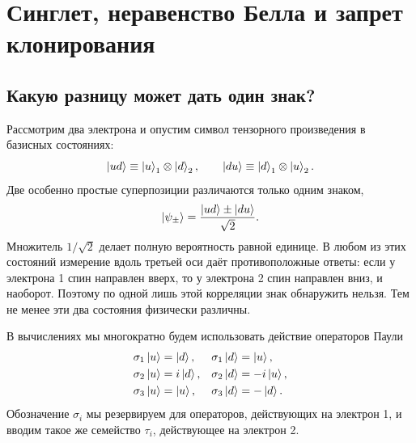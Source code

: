 \chapter{Синглет, неравенство Белла и запрет клонирования}


\section{Какую разницу может дать один знак?}

Рассмотрим два электрона и опустим символ тензорного произведения в базисных состояниях:
\begin{equation}
  \left\lvert ud\right\rangle\equiv\left\lvert u\right\rangle_1\otimes\left\lvert d\right\rangle_2,
  \qquad
  \left\lvert du\right\rangle\equiv\left\lvert d\right\rangle_1\otimes\left\lvert u\right\rangle_2.
\end{equation}
Две особенно простые суперпозиции различаются только одним знаком,
\begin{equation}
  \left\lvert\psi_\pm\right\rangle
  =
  \frac{\left\lvert ud\right\rangle\pm\left\lvert du\right\rangle}{\sqrt2}.
  \label{eq:l05-two-signs}
\end{equation}
Множитель \(1/\sqrt2\) делает полную вероятность равной единице. В любом из этих состояний измерение вдоль третьей оси даёт противоположные ответы: если у электрона 1 спин направлен вверх, то у электрона 2 спин направлен вниз, и наоборот. Поэтому по одной лишь этой корреляции знак обнаружить нельзя. Тем не менее эти два состояния физически различны.

В вычислениях мы многократно будем использовать действие операторов Паули
\begin{align}
  \sigma_1\left\lvert u\right\rangle&=\left\lvert d\right\rangle,&
  \sigma_1\left\lvert d\right\rangle&=\left\lvert u\right\rangle,\nonumber\\
  \sigma_2\left\lvert u\right\rangle&=i\left\lvert d\right\rangle,&
  \sigma_2\left\lvert d\right\rangle&=-i\left\lvert u\right\rangle,\nonumber\\
  \sigma_3\left\lvert u\right\rangle&=\left\lvert u\right\rangle,&
  \sigma_3\left\lvert d\right\rangle&=-\left\lvert d\right\rangle.
  \label{eq:l05-pauli-actions}
\end{align}
Обозначение \(\sigma_i\) мы резервируем для операторов, действующих на электрон 1, и вводим такое же семейство \(\tau_i\), действующее на электрон 2.

